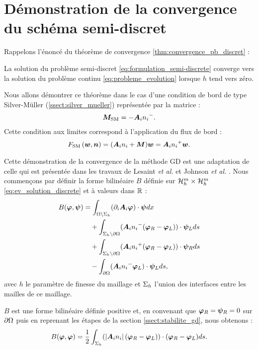 \chapter{Démonstration de la convergence du schéma semi-discret}
\label{annexe:demo_cv}


Rappelons l'énoncé du théorème de convergence
\ref{thm:convergence_pb_discret} :
\begin{theorem*}
	La solution du problème semi-discret \eqref{eq:formulation_semi-discrete}
	converge vers la solution du problème continu \eqref{eq:probleme_evolution}
	lorsque $h$ tend vers zéro.
\end{theorem*}

Nous allons démontrer ce théorème dans le cas d'une condition de bord
de type Silver-Müller (\ref{ssect:silver_mueller}) représentée par la matrice :
\begin{align}
	\bm{M}_{\mathrm{SM}} = - {\bm{A}_{i}n_{i}}^{-} .
\end{align}
Cette condition aux limites correspond à l’application du flux de bord :
\begin{align}
	F_\mathrm{SM}\left(\bm{w},\bm{n}\right) = ({\bm{A}_{i}n_{i}} + \bm{M}) \bm{w} = {\bm{A}_{i}n_{i}}^{+} \bm{w} .
\end{align}

Cette démonstration de la convergence de la méthode GD est une adaptation
de celle qui est
présentée dans les travaux de Lesaint \textit{et al.} \cite{LESAINT197489}
et Johnson \textit{et al.} \cite{Johnson:1986:ADG:21230.21231}.
Nous commençons par définir la forme bilinéaire $B$
définie sur $\mathcal{H}_h^m \times \mathcal{H}_h^m$
\eqref{eq:ev_solution_discrete} et à valeurs dans $\mathbb{R}$ :
\begin{equation}
	\begin{aligned}
		B(\bm{\varphi},\bm{\psi}) &=
		\int_{\Omega \setminus \Sigma_h}
			(\partial_{i} \bm{A}_{i} \bm{\varphi}) \cdot \bm{\psi} dx \\
		&\quad + \int_{\Sigma_h \setminus \partial\Omega}
			({\bm{A}_{i}n_{i}}^{-} (\bm{\varphi}_R - \bm{\varphi}_L)) \cdot \bm{\psi}_L ds \\
		&\quad + \int_{\Sigma_h \setminus \partial\Omega}
			({\bm{A}_{i}n_{i}}^{+} (\bm{\varphi}_R - \bm{\varphi}_L)) \cdot \bm{\psi}_R ds \\
		&\quad - \int_{\partial\Omega}
			({\bm{A}_{i}n_{i}}^{-} \bm{\varphi}_L) \cdot \bm{\psi}_L ds ,
	\end{aligned}
\end{equation}
avec $h$ le paramètre de finesse du maillage et $\Sigma_h$
l'union des interfaces entre les mailles de ce maillage.

$B$ est une forme bilinéaire définie positive et, en convenant que
$\bm{\varphi}_R = \bm{\psi}_R = 0$ sur $\partial\Omega$ puis
en reprenant les étapes de la section \ref{ssect:stabilite_gd},
nous obtenons :
\begin{align}
	B(\bm{\varphi},\bm{\varphi}) = \frac{1}{2} \int_{\Sigma_h}
	(\left\vert{\bm{A}_{i}n_{i}}\right\vert (\bm{\varphi}_R - \bm{\varphi}_L))
	\cdot (\bm{\varphi}_R - \bm{\varphi}_L) ds .
\end{align}

